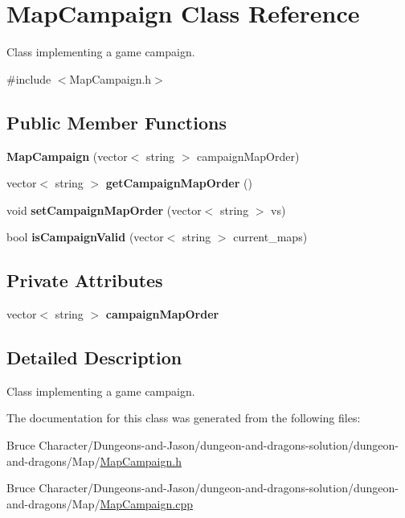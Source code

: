 \hypertarget{class_map_campaign}{}\section{Map\+Campaign Class Reference}
\label{class_map_campaign}


Class implementing a game campaign.  




{\ttfamily \#include $<$Map\+Campaign.\+h$>$}

\subsection*{Public Member Functions}
\begin{DoxyCompactItemize}
\item 
\hypertarget{class_map_campaign_ab46ea238162466d80ab92307ccd4727a}{}\label{class_map_campaign_ab46ea238162466d80ab92307ccd4727a} 
{\bfseries Map\+Campaign} (vector$<$ string $>$ campaign\+Map\+Order)
\item 
\hypertarget{class_map_campaign_a07a389028a6da2915ec1f36eab1e916f}{}\label{class_map_campaign_a07a389028a6da2915ec1f36eab1e916f} 
vector$<$ string $>$ {\bfseries get\+Campaign\+Map\+Order} ()
\item 
\hypertarget{class_map_campaign_ad15b4ab406ea835c4e90d1b87c9d6426}{}\label{class_map_campaign_ad15b4ab406ea835c4e90d1b87c9d6426} 
void {\bfseries set\+Campaign\+Map\+Order} (vector$<$ string $>$ vs)
\item 
\hypertarget{class_map_campaign_ae1da6d96efabc0f01ffc40b6c6373abe}{}\label{class_map_campaign_ae1da6d96efabc0f01ffc40b6c6373abe} 
bool {\bfseries is\+Campaign\+Valid} (vector$<$ string $>$ current\+\_\+maps)
\end{DoxyCompactItemize}
\subsection*{Private Attributes}
\begin{DoxyCompactItemize}
\item 
\hypertarget{class_map_campaign_a8e6a3b42230b720762bb30ec83aeb546}{}\label{class_map_campaign_a8e6a3b42230b720762bb30ec83aeb546} 
vector$<$ string $>$ {\bfseries campaign\+Map\+Order}
\end{DoxyCompactItemize}


\subsection{Detailed Description}
Class implementing a game campaign. 

The documentation for this class was generated from the following files\+:\begin{DoxyCompactItemize}
\item 
Bruce Character/\+Dungeons-\/and-\/\+Jason/dungeon-\/and-\/dragons-\/solution/dungeon-\/and-\/dragons/\+Map/\hyperlink{_map_campaign_8h}{Map\+Campaign.\+h}\item 
Bruce Character/\+Dungeons-\/and-\/\+Jason/dungeon-\/and-\/dragons-\/solution/dungeon-\/and-\/dragons/\+Map/\hyperlink{_map_campaign_8cpp}{Map\+Campaign.\+cpp}\end{DoxyCompactItemize}
